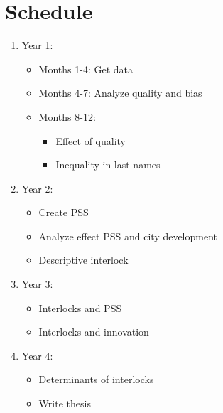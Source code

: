 \section{Schedule}
\label{sec:schedule}
\begin{enumerate}
\item Year 1: 
\begin{itemize}
\item Months 1-4: Get data
\item Months 4-7: Analyze quality and bias
\item Months 8-12: 
\begin{itemize}
\item  Effect of quality
\item  Inequality in last names
\end{itemize}
\end{itemize}
\item Year 2:
\begin{itemize}
\item  Create PSS
\item  Analyze effect PSS and city development
\item  Descriptive interlock
\end{itemize}
\item Year 3:
\begin{itemize}
\item  Interlocks and PSS
\item  Interlocks and innovation
\end{itemize}
\item Year 4:
\begin{itemize}
\item  Determinants of interlocks
\item Write thesis
\end{itemize}
\end{enumerate}


